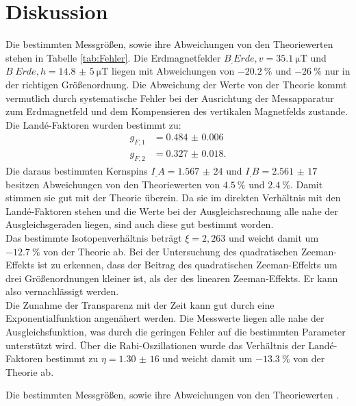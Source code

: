 
\section{Diskussion}
\label{sec:Diskussion}

Die bestimmten Messgrößen, sowie ihre Abweichungen von den Theoriewerten stehen in Tabelle \ref{tab:Fehler}. 
Die Erdmagnetfelder $B_.{Erde,v} = \SI{35,1}{\micro\tesla}$ und $B_.{Erde,h}=\SI{14,8(5)}{\micro\tesla}$ liegen mit Abweichungen von $\SI{-20,2}{\%}$ und $\SI{-26}{\%}$ nur in der richtigen Größenordnung. Die Abweichung der Werte von der Theorie kommt vermutlich durch systematische Fehler bei der Ausrichtung der Messapparatur zum Erdmagnetfeld und dem Kompensieren des vertikalen Magnetfelds zustande.\\
Die Landé-Faktoren wurden bestimmt zu:
\begin{align*}
g_{F,1} &= \num{0.484(6)}\\
g_{F,2} &= \num{0.327(18)}\text{.}
\end{align*}
Die daraus bestimmten Kernspins $I_.A= \num{1,567(24)}$ und $I_.B=\num{2,561(17)}$ besitzen Abweichungen von den Theoriewerten von $\SI{4,5}{\%}$ und $\SI{2,4}{\%}$. Damit stimmen sie gut mit der Theorie überein. Da sie im direkten Verhältnis mit den Landé-Faktoren stehen und die Werte bei der Ausgleichsrechnung alle nahe der Ausgleichsgeraden liegen, sind auch diese gut bestimmt worden.\\
Das bestimmte Isotopenverhältnis beträgt $\xi=2,263$ und weicht damit um $\SI{-12.7}{\%}$ von der Theorie ab.
Bei der Untersuchung des quadratischen Zeeman-Effekts ist zu erkennen, dass der Beitrag des quadratischen Zeeman-Effekts um drei Größenordnungen kleiner ist, als der des linearen Zeeman-Effekts. Er kann also vernachlässigt werden.\\
Die Zunahme der Transparenz mit der Zeit kann gut durch eine Exponentialfunktion angenähert werden. Die Messwerte liegen alle nahe der Ausgleichsfunktion, was durch die geringen Fehler auf die bestimmten Parameter unterstützt wird. 
Über die Rabi-Oszillationen wurde das Verhältnis der Landé-Faktoren bestimmt zu $\eta=\num{1,30(16)}$ und weicht damit um $\SI{-13.3}{\%}$ von der Theorie ab. 

\begin{table}
	\centering
	\caption{Die bestimmten Messgrößen, sowie ihre Abweichungen von den Theoriewerten \cite{erde,verhaeltnis,V21}.}
	
	\label{tab:Fehler}
\end{table}